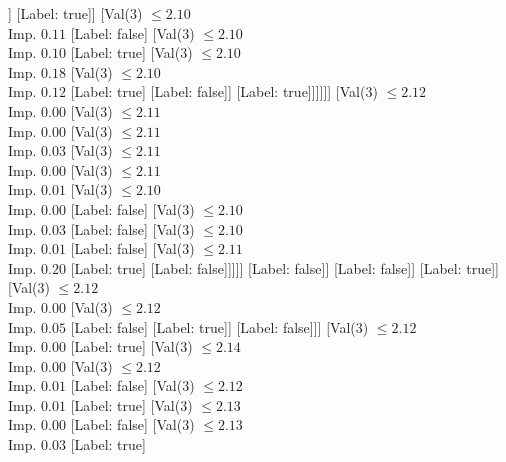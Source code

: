 \documentclass[margin=10pt]{standalone}
\begin{document}
\begin{forest}
													]
												[Label: true]]
											[Val($3$) $ \leq 2.10$ \\ Imp. $0.11$
												[Label: false]
												[Val($3$) $ \leq 2.10$ \\ Imp. $0.10$
													[Label: true]
													[Val($3$) $ \leq 2.10$ \\ Imp. $0.18$
														[Val($3$) $ \leq 2.10$ \\ Imp. $0.12$
															[Label: true]
															[Label: false]]
														[Label: true]]]]]]
									[Val($3$) $ \leq 2.12$ \\ Imp. $0.00$
										[Val($3$) $ \leq 2.11$ \\ Imp. $0.00$
											[Val($3$) $ \leq 2.11$ \\ Imp. $0.03$
												[Val($3$) $ \leq 2.11$ \\ Imp. $0.00$
													[Val($3$) $ \leq 2.11$ \\ Imp. $0.01$
														[Val($3$) $ \leq 2.10$ \\ Imp. $0.00$
															[Label: false]
															[Val($3$) $ \leq 2.10$ \\ Imp. $0.03$
																[Label: false]
																[Val($3$) $ \leq 2.10$ \\ Imp. $0.01$
																	[Label: false]
																	[Val($3$) $ \leq 2.11$ \\ Imp. $0.20$
																		[Label: true]
																		[Label: false]]]]]
														[Label: false]]
													[Label: false]]
												[Label: true]]
											[Val($3$) $ \leq 2.12$ \\ Imp. $0.00$
												[Val($3$) $ \leq 2.12$ \\ Imp. $0.05$
													[Label: false]
													[Label: true]]
												[Label: false]]]
										[Val($3$) $ \leq 2.12$ \\ Imp. $0.00$
											[Label: true]
											[Val($3$) $ \leq 2.14$ \\ Imp. $0.00$
												[Val($3$) $ \leq 2.12$ \\ Imp. $0.01$
													[Label: false]
													[Val($3$) $ \leq 2.12$ \\ Imp. $0.01$
														[Label: true]
														[Val($3$) $ \leq 2.13$ \\ Imp. $0.00$
															[Label: false]
															[Val($3$) $ \leq 2.13$ \\ Imp. $0.03$
																[Label: true]

\end{forest}
\end{document}
